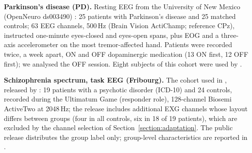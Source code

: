 \documentclass{article}
\begin{document}
\noindent\textbf{Parkinson's disease (PD).} Resting EEG from the University of New Mexico (OpenNeuro ds003490) \cite{cavanagh_ds003490}: 25 patients with Parkinson's disease and 25 matched controls; 63 EEG channels, 500\,Hz (Brain Vision ActiChamp; reference CPz), instructed one-minute eyes-closed and eyes-open spans, plus EOG and a three-axis accelerometer on the most tremor-affected hand. Patients were recorded twice, a week apart, ON and OFF dopaminergic medication (13 ON first, 12 OFF first); we analysed the OFF session. Eight subjects of this cohort were used by \cite{yao2025catd}.

\noindent\textbf{Schizophrenia spectrum, task EEG (Fribourg).} The cohort used in \cite{calhas2023medrxiv}, released by \cite{dataset2022fribourg}: 19 patients with a psychotic disorder (ICD-10) and 24 controls, recorded during the Ultimatum Game (responder role), 128-channel Biosemi ActiveTwo at 2048\,Hz; the release includes additional EXG channels whose layout differs between groups (four in all controls, six in 18 of 19 patients), which are excluded by the channel selection of Section~\ref{section:adaptation}. The public release distributes the group label only; group-level characteristics are reported in \cite{horat2018impaired}.
\end{document}
